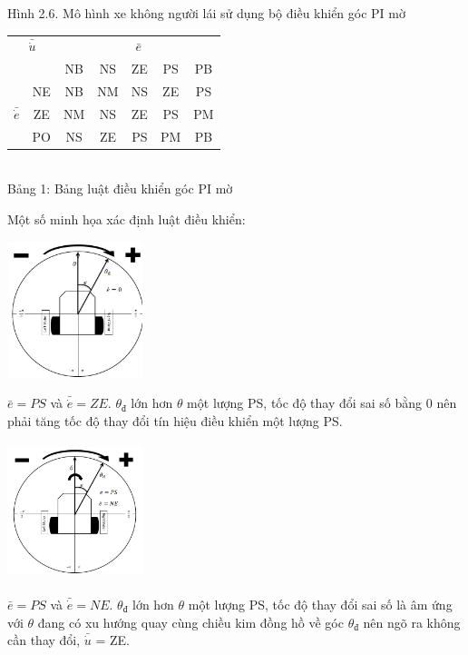 \documentclass[a4paper, 12pt]{article}
\begin{document}
\begin{enumerate}
\begin{center}
		Hình 2.6. Mô hình xe không người lái sử dụng bộ điều khiển góc PI mờ
	\end{center}
	\begin{center}
		\begin{tabular}{|c|c|c|c|c|c|c|}
			\hline
			\multicolumn{2}{|c|}{$\bar{\dot{u}}$} & \multicolumn{5}{c}{$\bar{e}$} \vline \\\cline{3-7}
			\multicolumn{2}{|c|}{} \vline& NB & NS & ZE & PS & PB \\\hline
			& NE & NB & NM & NS & ZE & PS \\\cline{2-7}
			$\bar{\dot{e}}$ & ZE & NM &NS & ZE & PS & PM \\\cline{2-7}
			& PO & NS & ZE & PS & PM & PB \\\hline
		\end{tabular}\\\vspace{0.5cm} 
	Bảng 1: Bảng luật điều khiển góc PI mờ
	\end{center}
	Một số minh họa xác định luật điều khiển:\\
	\begin{center}
		\includegraphics[width=150px,height=150px]{images/Case1}
	\end{center}
	$\bar{e} = PS$ và $\bar{\dot{e}} = ZE$. $\theta_{đ}$ lớn hơn $\theta$ một lượng PS, tốc độ thay đổi sai số bằng 0 nên phải tăng tốc độ thay đổi tín hiệu điều khiển một lượng PS.\\
	\begin{center}
		\includegraphics[width=150px,height=150px]{images/Case2}
	\end{center}
	$\bar{e} = PS$ và $\bar{\dot{e}} = NE$. $\theta_{đ}$ lớn hơn $\theta$ một lượng PS, tốc độ thay đổi sai số là âm ứng với $\theta$ đang có xu hướng quay cùng chiều kim đồng hồ về góc $\theta_{đ}$ nên ngõ ra không cần thay đổi, $\bar{\dot{u}}$ = ZE.\\

\end{enumerate}
\end{document}
